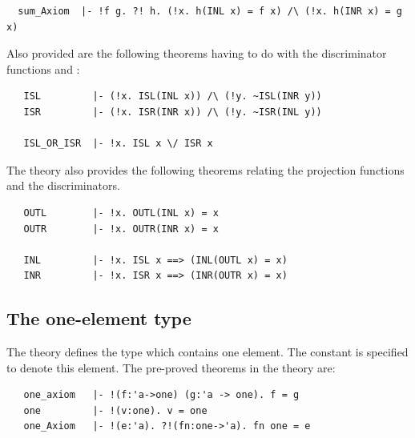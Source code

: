 \begin{hol}
\begin{verbatim}
  sum_Axiom  |- !f g. ?! h. (!x. h(INL x) = f x) /\ (!x. h(INR x) = g x)
\end{verbatim}
\end{hol}

\noindent Also provided are the following theorems having to
do with the discriminator functions  and :

\begin{hol}
\begin{verbatim}
   ISL         |- (!x. ISL(INL x)) /\ (!y. ~ISL(INR y))
   ISR         |- (!x. ISR(INR x)) /\ (!y. ~ISR(INL y))

   ISL_OR_ISR  |- !x. ISL x \/ ISR x
\end{verbatim}
\end{hol}

\noindent The  theory also provides the following theorems
relating the projection functions and the discriminators.

\begin{hol}
\begin{verbatim}
   OUTL        |- !x. OUTL(INL x) = x
   OUTR        |- !x. OUTR(INR x) = x

   INL         |- !x. ISL x ==> (INL(OUTL x) = x)
   INR         |- !x. ISR x ==> (INR(OUTR x) = x)
\end{verbatim}
\end{hol}



\subsection{The one-element type}%
%
%

The theory  defines  the type   which  contains one element.
The constant    is specified  to denote  this element.   The pre-proved
theorems in the theory  are:

\begin{hol}
\begin{verbatim}
   one_axiom   |- !(f:'a->one) (g:'a -> one). f = g
   one         |- !(v:one). v = one
   one_Axiom   |- !(e:'a). ?!(fn:one->'a). fn one = e
\end{verbatim}
\end{hol}

